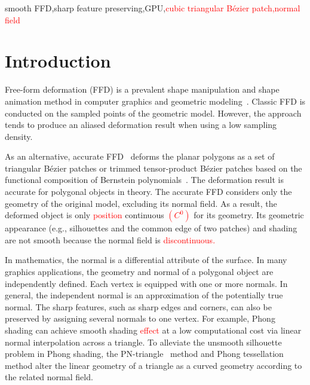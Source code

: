 \documentclass[3p]{elsarticle}
\begin{document}
\begin{frontmatter}
\begin{keyword}
smooth FFD\sep sharp feature preserving\sep GPU\sep \textcolor{red}{cubic triangular B\'ezier patch\sep normal field}
\end{keyword}

\end{frontmatter}

\linenumbers

\section{Introduction}

Free-form deformation (FFD) is a prevalent shape manipulation and shape animation method in computer graphics and
geometric modeling~\cite{Sederberg86}. Classic FFD is conducted on the sampled points of the geometric model. However,
the approach tends to produce an aliased deformation result when using a low sampling density.

As an alternative, accurate FFD~\cite{Feng98, Feng02, Feng00} deforms the planar polygons as a set of triangular
B\'ezier patches or trimmed tensor-product B\'ezier patches based on the functional composition of Bernstein
polynomials~\cite{DeRose88, DeRose93}. The deformation result is accurate for polygonal objects in theory. The accurate
FFD considers only the geometry of the original model, excluding its normal field. As a result, the deformed object is
only \textcolor{red}{position} continuous \textcolor{red}{$(C^0)$} for its geometry. Its geometric appearance (e.g.,
silhouettes and the common edge of two patches) and shading are not smooth because the normal field is
\textcolor{red}{discontinuous.}

In mathematics, the normal is a differential attribute of the surface. In many graphics applications, the geometry and
normal of a polygonal object are independently defined. Each vertex is equipped with one or more normals. In general,
the independent normal is an approximation of the potentially true normal. The sharp features, such as sharp edges and
corners, can also be preserved by assigning several normals to one vertex. For example, Phong shading can achieve smooth
shading \textcolor{red}{effect} at a low computational cost via linear normal interpolation across a triangle. To
alleviate the unsmooth silhouette problem in Phong shading, the PN-triangle~\cite{Vlachos01} method and Phong
tessellation~\cite{Boubekeur08} method alter the linear geometry of a triangle as a curved geometry according to the
related normal field.
\end{document}
